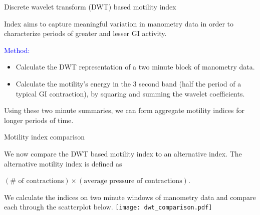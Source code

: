 \documentclass[]{beamer}
\begin{document}

\begin{frame}{Discrete wavelet transform (DWT) based motility index}

\small

Index aims to capture meaningful variation in manometry data in order to characterize periods of greater and lesser GI activity.

\bigskip

\textcolor{blue}{Method: }
\begin{itemize}
  \item Calculate the DWT representation of a two minute block of manometry data. 
  \item Calculate the motility's energy in the 3 second band (half the period of a typical GI contraction), by squaring and summing the wavelet coefficients.
\end{itemize}

\bigskip

Using these two minute summaries, we can form aggregate motility indices for longer periods of time.



\end{frame}


\begin{frame}{Motility index comparison}

\small

We now compare the DWT based motility index to an alternative index. The alternative motility index is defined as

\begin{center}
$(\#\text{ of contractions}) \times (\text{average pressure of contractions})$.
\end{center}

We calculate the indices on two minute windows of manometry data and compare each through the scatterplot below.
\texttt{[image: dwt\_comparison.pdf]}

\end{frame}
\end{document}
